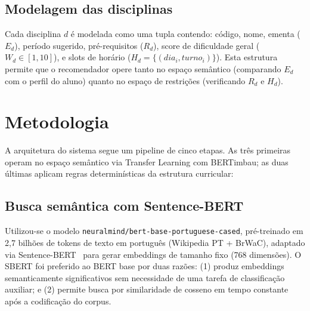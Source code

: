 \documentclass[12pt,a4paper]{article}
\begin{document}
\subsection{Modelagem das disciplinas}

Cada disciplina $d$ é modelada como uma tupla contendo: código, nome, ementa ($E_d$), período sugerido, pré-requisitos ($R_d$), score de dificuldade geral ($W_d \in [1,10]$), e slots de horário ($H_d = \{(dia_i, turno_i)\}$). Esta estrutura permite que o recomendador opere tanto no espaço semântico (comparando $E_d$ com o perfil do aluno) quanto no espaço de restrições (verificando $R_d$ e $H_d$).

\section{Metodologia}

A arquitetura do sistema segue um pipeline de cinco etapas. As três primeiras operam no espaço semântico via Transfer Learning com BERTimbau; as duas últimas aplicam regras determinísticas da estrutura curricular:

\begin{center}
\end{center}

\subsection{Busca semântica com Sentence-BERT}

Utilizou-se o modelo \texttt{neuralmind/bert-base-portuguese-cased}, pré-treinado em 2,7 bilhões de tokens de texto em português (Wikipedia PT + BrWaC), adaptado via Sentence-BERT~\cite{reimers2019sentence} para gerar embeddings de tamanho fixo (768 dimensões). O SBERT foi preferido ao BERT base por duas razões: (1) produz embeddings semanticamente significativos sem necessidade de uma tarefa de classificação auxiliar; e (2) permite busca por similaridade de cosseno em tempo constante após a codificação do corpus.
\end{document}
